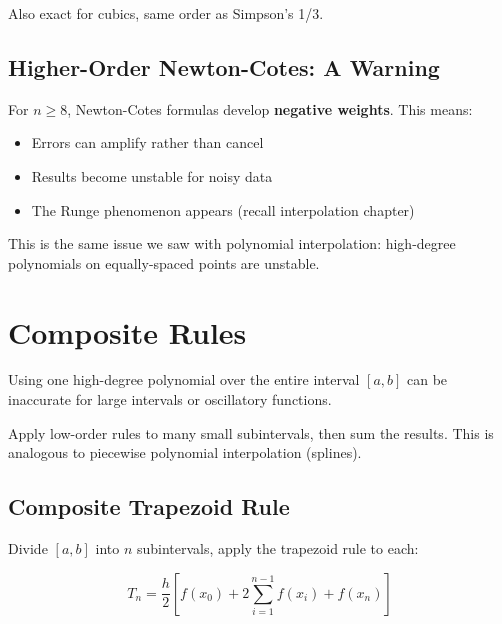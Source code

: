 Also exact for cubics, same order as Simpson's 1/3.


\subsection{Higher-Order Newton-Cotes: A Warning}


For $n \geq 8$, Newton-Cotes formulas develop \textbf{negative weights}. This means:
\begin{itemize}
    \item Errors can amplify rather than cancel
    \item Results become unstable for noisy data
    \item The Runge phenomenon appears (recall interpolation chapter)
\end{itemize}


This is the same issue we saw with polynomial interpolation: high-degree polynomials on equally-spaced points are unstable.




\newpage
\section{Composite Rules}

 Using one high-degree polynomial over the entire interval $[a,b]$ can be inaccurate for large intervals or oscillatory functions.

 Apply low-order rules to many small subintervals, then sum the results. This is analogous to piecewise polynomial interpolation (splines).


\subsection{Composite Trapezoid Rule}

Divide $[a,b]$ into $n$ subintervals, apply the trapezoid rule to each:

\begin{equation}
    \boxed{T_n = \frac{h}{2}\left[f(x_0) + 2\sum_{i=1}^{n-1} f(x_i) + f(x_n)\right]}
\end{equation}

